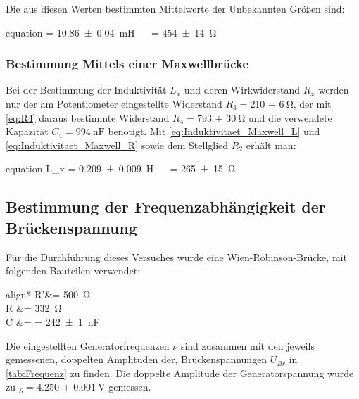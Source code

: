 		Die aus diesen Werten bestimmten Mittelwerte der Unbekannten Größen sind:
		\begin{empheq}{equation}
				\label{eq:LxRx_Brücke}
				 = \SI{10.86(4)}{\milli\henry} \quad\ \ \quad {} = \SI{454(14)}{\ohm}
		\end{empheq}		
		
		
	\subsubsection{Bestimmung Mittels einer Maxwellbrücke}
	\label{sec:Auswertung_Induktivität_Maxwell}
		
		Bei der Bestimmung der Induktivität $L_{x}$ und deren Wirkwiderstand $R_{x}$ werden 
		nur der am Potentiometer eingestellte Widerstand $R_{3}= \SI{210(6)}{\ohm} $, der mit \cref{eq:R4} 
		daraus bestimmte Widerstand $R_{4} = \SI{793(30)}{\ohm}$ und die verwendete Kapazität $C_{4} = 
		\SI{994}{\nano\farad}$  benötigt. Mit \cref{eq:Induktivitaet_Maxwell_L} und \cref{eq:Induktivitaet_Maxwell_R}
		sowie dem Stellglied $R_{2}$ erhält man:
		\begin{empheq}{equation}
				\label{eq:LxRx_Maxwell}
				{L_{x}} = \SI{0.209(9)}{\henry} \quad\ \  = \SI{265(15)}{\ohm}
		\end{empheq}
		
		
\subsection{Bestimmung der Frequenzabhängigkeit der Brückenspannung}
\label{sec:Auswertung_Frequenz}
	
	Für die Durchführung dieses Versuches wurde eine Wien-Robinson-Brücke, mit folgenden Bauteilen
	verwendet:
	\begin{empheq}{align*}
			R'&= \SI{500}{\ohm}\\
			R &= \SI{332}{\ohm} \\
			C &=  \footnotemark = \SI{242(1)}{\nano\farad}
	\end{empheq}		
	
	Die eingestellten Generatorfrequenzen $\nu$ sind zusammen mit den jeweils gemessenen, doppelten Amplituden der, 
	Brückenspannungen $U_{Br}$ in \cref{tab:Frequenz} zu finden. Die doppelte Amplitude der Generatorspannung wurde zu
	$_{S} = \SI{4.250(1)}{\volt}$ gemessen. 
	
	
	

